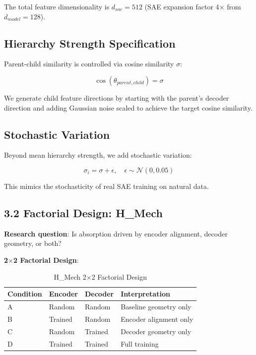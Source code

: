 \documentclass{article}
\begin{document}
The total feature dimensionality is $d_{sae} = 512$ (SAE expansion factor 4$\times$ from $d_{model} = 128$).

\subsection{Hierarchy Strength Specification}

Parent-child similarity is controlled via cosine similarity $\sigma$:

$$\cos(\theta_{parent, child}) = \sigma$$

We generate child feature directions by starting with the parent's decoder direction and adding Gaussian noise scaled to achieve the target cosine similarity.

\subsection{Stochastic Variation}

Beyond mean hierarchy strength, we add stochastic variation:

$$\sigma_i = \sigma + \epsilon, \quad \epsilon \sim \mathcal{N}(0, 0.05)$$

This mimics the stochasticity of real SAE training on natural data.

\subsection{3.2 Factorial Design: H\_Mech}

\textbf{Research question}: Is absorption driven by encoder alignment, decoder geometry, or both?

\textbf{2$\times$2 Factorial Design}:

\begin{table}[h]
\centering
\caption{H\_Mech 2$\times$2 Factorial Design}
\label{tab:factorial_design}
\begin{tabular}{llll}
\toprule
Condition & Encoder & Decoder & Interpretation \\
\midrule
A & Random & Random & Baseline geometry only \\
B & Trained & Random & Encoder alignment only \\
C & Random & Trained & Decoder geometry only \\
D & Trained & Trained & Full training \\
\bottomrule
\end{tabular}
\end{table}
\end{document}
